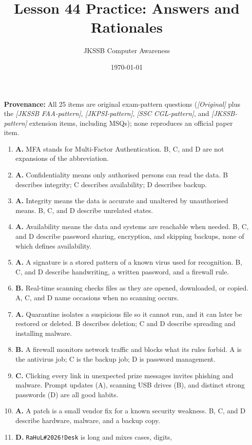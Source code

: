 \documentclass[11pt]{article}
\title{Lesson 44 Practice: Answers and Rationales}
\author{JKSSB Computer Awareness}
\date{\today}
\begin{document}
\maketitle
\noindent\textbf{Provenance:} All 25 items are original exam-pattern questions (\textit{[Original]} plus the \textit{[JKSSB FAA-pattern]}, \textit{[JKPSI-pattern]}, \textit{[SSC CGL-pattern]}, and \textit{[JKSSB-pattern]} extension items, including MSQs); none reproduces an official paper item.
\begin{enumerate}[label=\textbf{Q\arabic*.}, leftmargin=*]
\item \textbf{A.} MFA stands for Multi-Factor Authentication. B, C, and D are
  not expansions of the abbreviation.
\item \textbf{A.} Confidentiality means only authorised persons can read the
  data. B describes integrity; C describes availability; D describes backup.
\item \textbf{A.} Integrity means the data is accurate and unaltered by
  unauthorised means. B, C, and D describe unrelated states.
\item \textbf{A.} Availability means the data and systems are reachable when
  needed. B, C, and D describe password sharing, encryption, and skipping
  backups, none of which defines availability.
\item \textbf{A.} A signature is a stored pattern of a known virus used for
  recognition. B, C, and D describe handwriting, a written password, and a
  firewall rule.
\item \textbf{B.} Real-time scanning checks files as they are opened,
  downloaded, or copied. A, C, and D name occasions when no scanning occurs.
\item \textbf{A.} Quarantine isolates a suspicious file so it cannot run, and
  it can later be restored or deleted. B describes deletion; C and D describe
  spreading and installing malware.
\item \textbf{B.} A firewall monitors network traffic and blocks what its
  rules forbid. A is the antivirus job; C is the backup job; D is password
  management.
\item \textbf{C.} Clicking every link in unexpected prize messages invites
  phishing and malware. Prompt updates (A), scanning USB drives (B), and
  distinct strong passwords (D) are all good habits.
\item \textbf{A.} A patch is a small vendor fix for a known security
  weakness. B, C, and D describe hardware, malware, and a backup copy.
\item \textbf{D.} \texttt{RaHuL\#2026!Desk} is long and mixes cases, digits,

\end{enumerate}
\end{document}

